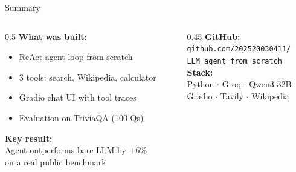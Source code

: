 \documentclass[aspectratio=169]{beamer}
\begin{document}
\begin{frame}{Summary}
  \begin{columns}[T]
    \begin{column}{0.5\textwidth}
      \vspace{0.3cm}
      \textbf{What was built:}
      \begin{itemize}
        \item ReAct agent loop from scratch
        \item 3 tools: search, Wikipedia, calculator
        \item Gradio chat UI with tool traces
        \item Evaluation on TriviaQA (100 Qs)
      \end{itemize}
      \vspace{0.5cm}
      \textbf{Key result:}\\
      Agent outperforms bare LLM by \alert{+6\%}\\
      on a real public benchmark
    \end{column}
    \begin{column}{0.45\textwidth}
      \vspace{0.3cm}
      \textbf{GitHub:}\\[4pt]
      \small \texttt{github.com/202520030411/}\\
      \texttt{LLM\_agent\_from\_scratch}\\[1cm]
      \textbf{Stack:}\\[4pt]
      Python $\cdot$ Groq $\cdot$ Qwen3-32B\\
      Gradio $\cdot$ Tavily $\cdot$ Wikipedia
    \end{column}
  \end{columns}
\end{frame}
\end{document}
